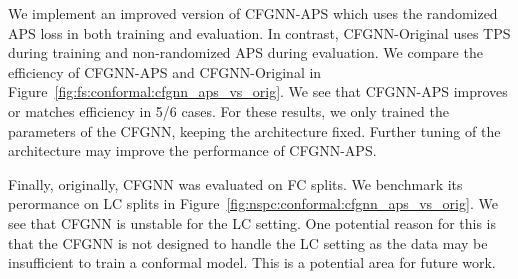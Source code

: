 We implement an improved version of CFGNN-APS which uses the randomized APS loss in both training and evaluation.
In contrast, CFGNN-Original uses TPS during training and non-randomized APS during evaluation.
We compare the efficiency of CFGNN-APS and CFGNN-Original in Figure~\ref{fig:fs:conformal:cfgnn_aps_vs_orig}.
We see that CFGNN-APS improves or matches efficiency in 5/6 cases.
For these results, we only trained the parameters of the CFGNN, keeping the architecture fixed.
Further tuning of the architecture may improve the performance of CFGNN-APS.

Finally, originally, CFGNN was evaluated on FC splits.
We benchmark its perormance on LC splits in Figure~\ref{fig:nspc:conformal:cfgnn_aps_vs_orig}.
We see that CFGNN is unstable for the LC setting.
One potential reason for this is that the CFGNN is not designed to handle the LC setting as the data may be insufficient to train a conformal model.
This is a potential area for future work.